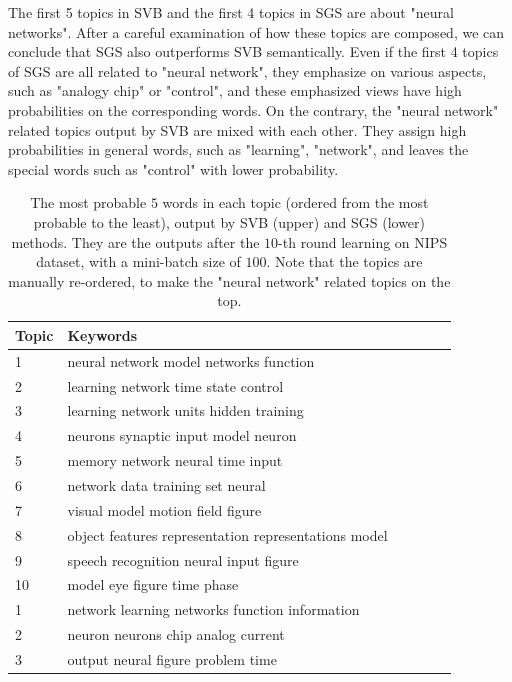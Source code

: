 \documentclass{article} %
\begin{document}
The first 5 topics in SVB and the first 4 topics in SGS are about "neural networks". After a careful examination of how these topics are composed, we can conclude that SGS also outperforms SVB semantically. Even if the first 4 topics of SGS are all related to "neural network", they emphasize on various aspects, such as "analogy chip" or "control", and these emphasized views have high probabilities on the corresponding words. On the contrary, the "neural network" related topics output by SVB are mixed with each other. They assign high probabilities in general words, such as "learning", "network", and leaves the special words such as "control" with lower probability. 

\begin{table}[t]
\caption{The most probable $5$ words in each topic (ordered from the most probable to the least), output by SVB (upper) and SGS (lower) methods. They are the outputs after the $10$-th round learning on NIPS dataset, with a mini-batch size of $100$. Note that the topics are manually re-ordered, to make the "neural network" related topics on the top.}
\label{tbl:sample_topics}
\vskip 0.15in
\begin{center}
\begin{small}
\begin{tabular}{llllll}
\hline
{\sc Topic} & {\sc Keywords} \\
\hline
1 &  neural network model networks function \\
 2 & learning network time state control \\
 3 & learning network units hidden training \\
 4 & neurons synaptic input model neuron \\
 5 & memory network neural time input  \\
 6 & network data training set neural \\
 7 & visual model motion field figure \\
 8 & object features representation representations model\\
 9 & speech recognition neural input figure \\
 10 & model eye figure time phase\\
\hline
\hline
1 & network learning networks function information \\
2 & neuron neurons chip analog current\\
3 & output neural figure problem time \\

\end{tabular}
\end{small}
\end{center}
\end{table}
\end{document}
